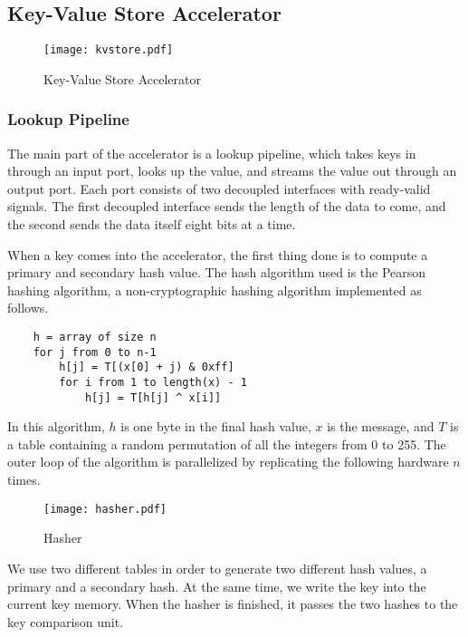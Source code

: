 \subsection{Key-Value Store Accelerator}

\begin{figure}[h]
    \begin{center}
\texttt{[image: kvstore.pdf]}
\caption{Key-Value Store Accelerator}
\label{fig:kvstore}
    \end{center}
\end{figure}

\subsubsection{Lookup Pipeline}

The main part of the accelerator is a lookup pipeline, which takes keys in
through an input port, looks up the value, and streams the value out through an
output port. Each port consists of two decoupled interfaces with ready-valid
signals. The first decoupled interface sends the length of the data to come,
and the second sends the data itself eight bits at a time.

When a key comes into the accelerator, the first thing done is to compute a
primary and secondary hash value. The hash algorithm used is the Pearson
hashing algorithm, a non-cryptographic hashing algorithm implemented as follows.

{\footnotesize
\begin{verbatim}
    h = array of size n
    for j from 0 to n-1
        h[j] = T[(x[0] + j) & 0xff]
        for i from 1 to length(x) - 1
            h[j] = T[h[j] ^ x[i]]
\end{verbatim}
}

In this algorithm, \(h\) is one byte in the final hash value,
\(x\) is the message, and \(T\) is a table containing a random permutation of
all the integers from 0 to 255. The outer loop of the algorithm is
parallelized by replicating the following hardware \(n\) times.

\begin{figure}[h]
    \begin{center}
\texttt{[image: hasher.pdf]}
\caption{Hasher}
\label{fig:hasher}
    \end{center}
\end{figure}
We use two different tables in order to generate two different hash values,
a primary and a secondary hash. At the same time, we write the key into the
current key memory. When the hasher is finished, it passes the two hashes
to the key comparison unit.

